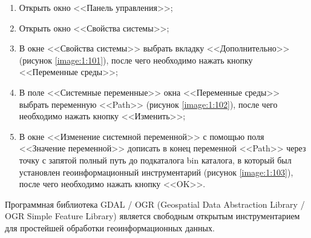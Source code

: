 \begin{enumerate}
\begin{enumerate}
		\item Открыть окно <<Панель управления>>;
		\item Открыть окно <<Свойства системы>>;
		\item В окне <<Свойства системы>> выбрать вкладку <<Дополнительно>> (рисунок \ref{image:1:101}), после чего необходимо нажать кнопку <<Переменные среды>>;
		\item В поле <<Системные переменные>> окна <<Переменные среды>> выбрать переменную <<Path>> (рисунок \ref{image:1:102}), после чего необходимо нажать кнопку <<Изменить>>;
		\item В окне <<Изменение системной переменной>> с помощью поля <<Значение переменной>> дописать в конец переменной <<Path>> через точку с запятой полный путь до подкаталога bin каталога, в который был установлен геоинформационный инструментарий (рисунок \ref{image:1:103}), после чего необходимо нажать кнопку <<OK>>.

	\end{enumerate}

\end{enumerate}

\begin{landscape}
\end{landscape}


Программная библиотека GDAL / OGR (Geospatial Data Abstraction Library / OGR Simple Feature Library) \cite{gdal-ogr} является свободным открытым инструментарием для простейшей обработки геоинформационных данных.

